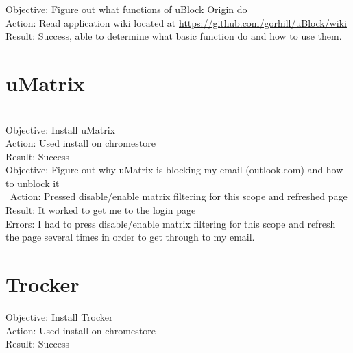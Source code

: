 \documentclass{article}
\begin{document}
Objective: Figure out what functions of uBlock Origin do\\
Action: Read application wiki located at \href{https://github.com/gorhill/uBlock/wiki}{https://github.com/gorhill/uBlock/wiki} 
Result: Success, able to determine what basic function do and how to use them.

\section{uMatrix}\\
Objective: Install uMatrix \\
Action: Used install on chromestore\\
Result: Success\\

Objective: Figure out why uMatrix is blocking my email (outlook.com) and how to unblock it\\\
Action: Pressed disable/enable matrix filtering for this scope and refreshed page\\
Result: It worked to get me to the login page\\
Errors: I had to press disable/enable matrix filtering for this scope and refresh the page several times in order to get through to my email. \\

\section{Trocker}
Objective: Install Trocker \\
Action: Used install on chromestore\\
Result: Success\\
\end{document}
